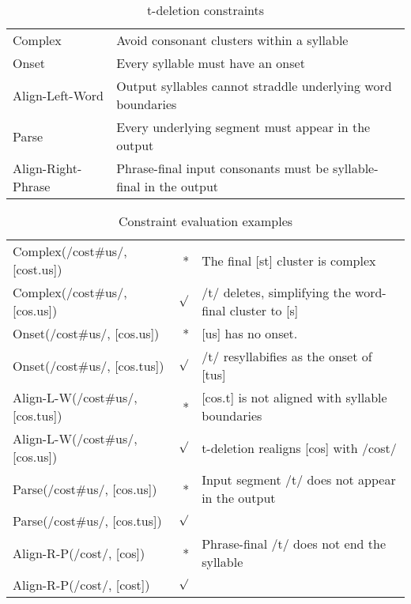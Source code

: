 \documentclass[11pt]{article}
\begin{document}
\begin{table}
\begin{tabular}{l|l}
  {\sc *Complex} & Avoid consonant clusters within a syllable \\
  {\sc Onset} & Every syllable must have an onset \\
  {\sc Align-Left-Word} & Output syllables cannot straddle underlying word
  boundaries \\
  {\sc Parse} & Every underlying segment must appear in the output \\
  {\sc Align-Right-Phrase} & Phrase-final input consonants must be syllable-final in the output \\
\end{tabular}
\caption{t-deletion constraints}
\label{cost-constraints}
\end{table}

\begin{table}
  \begin{tabular}{lr|l}
    {\sc *Complex}(/cost\#us/, [cost.us]) & * & The final [st] cluster
    is complex \\
    {\sc *Complex}(/cost\#us/, [cos.us]) & $\surd$ & /t/ deletes,
    simplifying the word-final cluster to [s] \\ \hline
    {\sc Onset}(/cost\#us/, [cos.us]) & * & [us] has no onset. \\
    {\sc Onset}(/cost\#us/, [cos.tus]) & $\surd$ & /t/ resyllabifies
    as the onset of [tus] \\ \hline
    {\sc Align-L-W}(/cost\#us/, [cos.tus]) & * & [cos.t] is not
    aligned with syllable boundaries \\
    {\sc Align-L-W}(/cost\#us/, [cos.us]) & $\surd$ & t-deletion realigns
    [cos] with /cost/ \\ \hline
    {\sc Parse}(/cost\#us/, [cos.us])& * & Input segment /t/ does not appear in the
    output \\
    {\sc Parse}(/cost\#us/, [cos.tus]) & $\surd$ & \\ \hline
    {\sc Align-R-P}(/cost/, [cos]) & * & Phrase-final /t/ does not
    end the syllable \\
    {\sc Align-R-P}(/cost/, [cost]) & $\surd$ & \\ \hline
  \end{tabular}
  \caption{Constraint evaluation examples}
  \label{cost-constraints-example}
\end{table}
\end{document}
